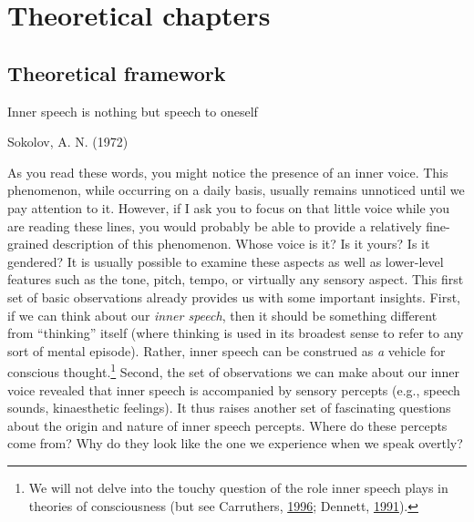 \documentclass[a4paper,12pt,twoside,openright,oldfontcommands]{memoir}
\let\rmarkdownfootnote\footnote%
\def\footnote{\protect\rmarkdownfootnote}
\newcommand{\initial}[1]{
	\lettrine[lines=3,lhang=0.33,nindent=0em]{
		\color{gray}
     		{\textsc{#1}}}{}}
\begin{document}
\renewcommand{\contentsname}{Table of contents}
\tableofcontents*
{}
\newpage

\listoftables
{}
\newpage

\listoffigures
{}
\newpage


\hypertarget{part-theoretical-chapters}{%
\part{Theoretical chapters}\label{part-theoretical-chapters}}

\sloppy 

\hypertarget{intro}{%
\chapter{Theoretical framework}\label{intro}}

\epigraph{Inner speech is nothing but speech to oneself}{Sokolov, A. N. (1972)}

\initial{A}s you read these words, you might notice the presence of an inner voice. This phenomenon, while occurring on a daily basis, usually remains unnoticed until we pay attention to it. However, if I ask you to focus on that little voice while you are reading these lines, you would probably be able to provide a relatively fine-grained description of this phenomenon. Whose voice is it? Is it yours? Is it gendered? It is usually possible to examine these aspects as well as lower-level features such as the tone, pitch, tempo, or virtually any sensory aspect. This first set of basic observations already provides us with some important insights. First, if we can think about our \emph{inner speech}, then it should be something different from \enquote{thinking} itself (where thinking is used in its broadest sense to refer to any sort of mental episode). Rather, inner speech can be construed as \emph{a} vehicle for conscious thought.\footnote{We will not delve into the touchy question of the role inner speech plays in theories of consciousness (but see Carruthers, \protect\hyperlink{ref-carruthers_language_1996}{1996}; Dennett, \protect\hyperlink{ref-dennett_consciousness_1991}{1991}).} Second, the set of observations we can make about our inner voice revealed that inner speech is accompanied by sensory percepts (e.g., speech sounds, kinaesthetic feelings). It thus raises another set of fascinating questions about the origin and nature of inner speech percepts. Where do these percepts come from? Why do they look like the one we experience when we speak overtly?
\end{document}
